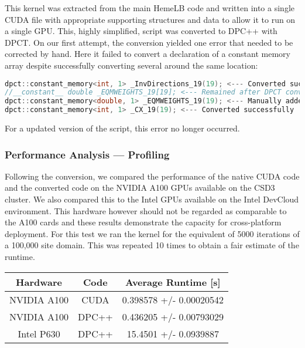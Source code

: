 \documentclass[../main]{subfiles}
\begin{document}
This kernel was extracted from the main HemeLB code and written into a single CUDA file with appropriate supporting structures and data to allow it to run on a single GPU.
This, highly simplified, script was converted to DPC++ with DPCT.
On our first attempt, the conversion yielded one error that needed to be corrected by hand.
Here it failed to convert a declaration of a constant memory array despite successfully converting several around the same location:

\begin{lstlisting}[language=C++,basicstyle=\small]
dpct::constant_memory<int, 1> _InvDirections_19(19); <--- Converted successfully
//__constant__ double _EQMWEIGHTS_19[19]; <--- Remained after DPCT conversion
dpct::constant_memory<double, 1> _EQMWEIGHTS_19(19); <--- Manually added
dpct::constant_memory<int, 1> _CX_19(19); <--- Converted successfully
\end{lstlisting}

For a updated version of the script, this error no longer occurred.

\subsubsection{Performance Analysis --- Profiling}\label{sec:hemelb_performance}
Following the conversion, we compared the performance of the native CUDA code and the converted code on the NVIDIA A100 GPUs available on the CSD3 cluster.
We also compared this to the Intel GPUs available on the Intel DevCloud environment.
This hardware however should not be regarded as comparable to the A100 cards and these results demonstrate the capacity for cross-platform deployment.
For this test we ran the kernel for the equivalent of 5000 iterations of a 100,000 site domain.
This was repeated 10 times to obtain a fair estimate of the runtime.

\begin{center}
	\begin{tabular}{||c c c||}
		\hline
		Hardware    & Code  & Average Runtime [s]     \\ [0.5ex]
		\hline\hline
		NVIDIA A100 & CUDA  & 0.398578 +/- 0.00020542 \\
		\hline
		NVIDIA A100 & DPC++ & 0.436205 +/- 0.00793029 \\
		\hline
		Intel P630  & DPC++ & 15.4501 +/- 0.0939887   \\ [1ex]
		\hline
	\end{tabular}
\end{center}
\end{document}

